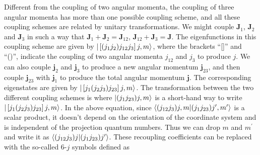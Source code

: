 Different from the coupling of two angular momenta, the coupling of three angular momenta has more than one possible
 coupling scheme, and all these coupling schemes are related by unitary transformations. We might couple $\mathbf{J}_{1}$, $\mathbf{J}_{2}$ and $\mathbf{J}_{3}$ in such a way that
  $\mathbf{J}_{1} + \mathbf{J}_{2}=\mathbf{J}_{12}$, $\mathbf{J}_{12} + \mathbf{J}_{3}= \mathbf{J}$. The eigenfunctions in this coupling scheme are given by $| \left[(j_1 j_2) j_{12} j_3\right] j, m \rangle$, where
  the brackets ``[]'' and ``()'',  indicate the coupling of two angular momenta $j_{12}$ and $j_3$ 
  to produce  $j$. We can also couple $\mathbf{j}_{2}$ and $\mathbf{j}_{3}$ to produce a new angular momentum 
  $\mathbf{j}_{23}$, and then couple $\mathbf{j}_{23}$ with  $\mathbf{j}_{1}$ to produce the total angular
   momentum  $\mathbf{j}$. The corresponding eigenstates are given by $| \left[j_1(j_2 j_3) j_{23}\right] j, m \rangle$. 
The transformation between the two different coupling schemes is
where $|  (j_1 j_{23}) j, m  \rangle$ is a short-hand way to write  $| \left[j_1(j_2 j_3) j_{23}\right] j, m \rangle$.  In the above 
equation, since $\langle  (j_{12} j_3) j, m \allowbreak |  (j_1 j_{23}) j^{\prime}, m^{\prime}  \rangle$ is a scalar product, it 
doesn't depend on the orientation of the coordinate system and is independent of the projection quantum numbers. Thus we can drop $m$ and $m^{\prime}$ and write it as 
$\langle  (j_{12} j_3) j  |  (j_1 j_{23}) j^{\prime}  \rangle$. These recoupling coefficients can be replaced with the so-called
6-$j$ symbols defined as\cite{zare-book}


  
  
